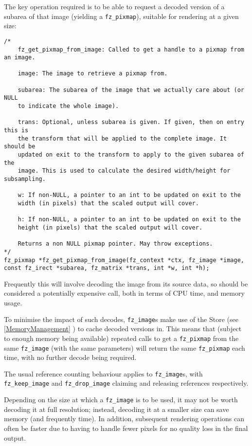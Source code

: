 \documentclass[oneside]{book}
\newcommand{\rjwref}[1] {\autoref{#1} \nameref{#1}}
\begin{document}
The key operation required is to be able to request a decoded version of a subarea of that image (yielding a \texttt{fz\_pixmap}), suitable for rendering at a given size:

\begin{lstlisting}
/*
	fz_get_pixmap_from_image: Called to get a handle to a pixmap from an image.

	image: The image to retrieve a pixmap from.

	subarea: The subarea of the image that we actually care about (or NULL
	to indicate the whole image).

	trans: Optional, unless subarea is given. If given, then on entry this is
	the transform that will be applied to the complete image. It should be
	updated on exit to the transform to apply to the given subarea of the
	image. This is used to calculate the desired width/height for subsampling.

	w: If non-NULL, a pointer to an int to be updated on exit to the
	width (in pixels) that the scaled output will cover.

	h: If non-NULL, a pointer to an int to be updated on exit to the
	height (in pixels) that the scaled output will cover.

	Returns a non NULL pixmap pointer. May throw exceptions.
*/
fz_pixmap *fz_get_pixmap_from_image(fz_context *ctx, fz_image *image, const fz_irect *subarea, fz_matrix *trans, int *w, int *h);
\end{lstlisting}

Frequently this will involve decoding the image from its source data, so should be considered a potentially expensive call, both in terms of CPU time, and memory usage.

To minimise the impact of such decodes, \texttt{fz\_image}s make use of the Store (see \rjwref{MemoryManagement}) to cache decoded versions in.  This means that (subject to enough memory being available) repeated calls to get a \texttt{fz\_pixmap} from the same \texttt{fz\_image} (with the same parameters) will return the same \texttt{fz\_pixmap} each time, with no further decode being required.

The usual reference counting behaviour applies to \texttt{fz\_image}s, with \texttt{fz\_keep\_image} and \texttt{fz\_drop\_image} claiming and releasing references respectively.

Depending on the size at which a \texttt{fz\_image} is to be used, it may not be worth decoding it at full resolution; instead, decoding it at a smaller size can save memory (and frequently time). In addition, subsequent rendering operations can often be faster due to having to handle fewer pixels for no quality loss in the final output.
\end{document}
